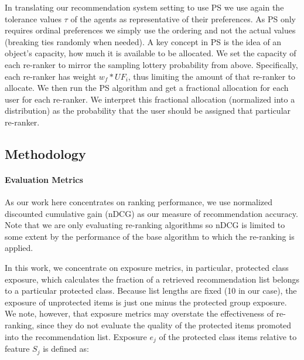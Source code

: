 In translating our recommendation system setting to use PS we use again the tolerance values $\tau$ of the agents as representative of their preferences. As PS only requires ordinal preferences we simply use the ordering and not the actual values (breaking ties randomly when needed). A key concept in PS is the idea of an object's capacity, how much it is available to be allocated. 
We set the capacity of each re-ranker to mirror the sampling lottery probability from above.
Specifically, each re-ranker has weight $w_f * UF_i$, thus limiting the amount of that re-ranker to allocate.
We then run the PS algorithm and get a fractional allocation for each user for each re-ranker.  We interpret this fractional allocation (normalized into a distribution) as the probability that the user should be assigned that particular re-ranker.


\subsection{Methodology}

\noindent \paragraph{Evaluation Metrics} \newline
\indent As our work here concentrates on ranking performance, we use normalized discounted cumulative gain (nDCG) as our measure of recommendation accuracy. Note that we are only evaluating re-ranking algorithms so nDCG is limited to some extent by the performance of the base algorithm to which the re-ranking is applied. 


In this work, we concentrate on exposure metrics, in particular, protected class exposure, which calculates the fraction of a retrieved recommendation list belongs to a particular protected class. 
Because list lengths are fixed (10 in our case), the exposure of unprotected items is just one minus the protected group exposure. We note, however, that exposure metrics may overstate the effectiveness of re-ranking, since they do not evaluate the quality of the protected items promoted into the recommendation list. Exposure $e_j$ of the protected class items relative to feature $S_j$ is defined as:

